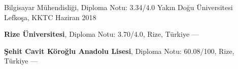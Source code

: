 
\begin{cventries}
  \cventry
    {Bilgisayar Mühendisliği, Diploma Notu: 3.34/4.0} %
    {Yakın Doğu Üniversitesi} %
    {Lefkoşa, KKTC} %
    {Haziran 2018} %
    {
      \begin{cvitems} %
         \item {\textbf{Rize Üniversitesi}, Diploma Notu: 3.70/4.0, Rize, Türkiye --- }
         \vspace{0.5mm}
         \item {\textbf{Şehit Cavit Köroğlu Anadolu Lisesi}, Diploma Notu: 60.08/100, Rize, Türkiye --- }
      \end{cvitems}
    }
\end{cventries}
